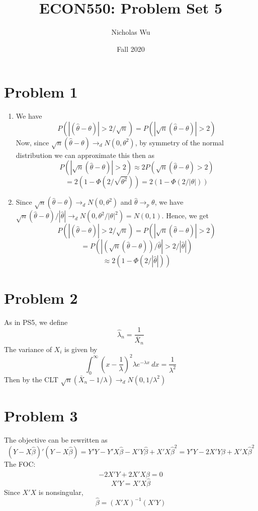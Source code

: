 \documentclass[10pt,letter]{article}
\begin{document}


\title{ECON550: Problem Set 5}

\author{Nicholas Wu}

\date{Fall 2020}

\maketitle
\section*{Problem 1}
\begin{enumerate}[label=(\alph*)]
\item We have
\[ P(|(\hat{\theta} - \theta)| > 2/\sqrt{n}) = P(|\sqrt{n}(\hat{\theta} - \theta)| > 2) \]
Now, since $\sqrt{n}(\hat{\theta} - \theta) \to_d N(0, \theta^2)$, by symmetry of the normal distribution we can approximate this then as
\[ P(|\sqrt{n}(\hat{\theta} - \theta)| > 2) \approx 2P(\sqrt{n}(\hat{\theta} - \theta) > 2) \]
\[ = 2 (1 - \Phi(2/\sqrt{\theta^2})) = 2 (1 - \Phi(2/|\theta|)) \]
\item Since $\sqrt{n}(\hat{\theta} - \theta) \to_d N(0, \theta^2)$ and $\hat{\theta} \to_p \theta$, we have $\sqrt{n}(\hat{\theta} - \theta)/|\hat{\theta}| \to_d N(0, \theta^2/|\theta|^2) = N(0,1)$. Hence, we get
\[ P(|(\hat{\theta} - \theta)| > 2/\sqrt{n}) = P(|\sqrt{n}(\hat{\theta} - \theta)| > 2) \]
\[  = P(|(\sqrt{n}(\hat{\theta} - \theta))/\hat{\theta}| > 2/|\hat{\theta}|) \]
\[ \approx 2 (1 - \Phi(2/|\hat{\theta}|)) \]
\end{enumerate}
\section*{Problem 2}
As in PS5, we define
\[ \hat{\lambda}_n = \frac{1}{\bar{X}_n} \]
The variance of $X_i$ is given by
\[ \int_0^\infty  \left(x - \frac{1}{\lambda}\right)^2 \lambda e^{-\lambda x} \ dx = \frac{1}{\lambda^2} \]
Then by the CLT $\sqrt{n}(\bar{X}_n - 1/\lambda) \to_d N(0, 1/\lambda^2)$
\section*{Problem 3}
The objective can be rewritten as
\[ (Y - X\hat{\beta})'(Y - X\hat{\beta}) = Y'Y - Y'X\hat{\beta} - X'Y\hat{\beta} + X'X\hat{\beta}^2 = Y'Y - 2X'Y\hat{\beta} +  X'X\hat{\beta}^2 \]
The FOC:
\[ -2 X'Y + 2 X'X\hat{\beta} = 0 \]
\[ X'Y  = X'X\hat{\beta}  \]
Since $X'X$ is nonsingular,
\[\hat{\beta} =  ( X'X)^{-1} (X'Y)  \]
\end{document}
